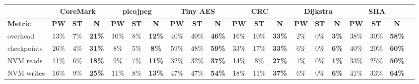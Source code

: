 \begin{tabular}{@{}l|ccccccccccccccccccc@{}}
\toprule
 & \multicolumn{3}{c}{\textbf{\textsf{CoreMark}}} & \multicolumn{3}{c}{\textbf{\textsf{picojpeg}}} & \multicolumn{3}{c}{\textbf{\textsf{Tiny AES}}} & \multicolumn{3}{c}{\textbf{\textsf{CRC}}} & \multicolumn{3}{c}{\textbf{\textsf{Dijkstra}}} & \multicolumn{3}{c}{\textbf{\textsf{SHA}}} \\ \midrule
\textbf{Metric} & \textbf{\textsf{PW}} & \textbf{\textsf{ST}} & \textbf{\textsf{N}} & \textbf{\textsf{PW}} & \textbf{\textsf{ST}} & \textbf{\textsf{N}} & \textbf{\textsf{PW}} & \textbf{\textsf{ST}} & \textbf{\textsf{N}} & \textbf{\textsf{PW}} & \textbf{\textsf{ST}} & \textbf{\textsf{N}} & \textbf{\textsf{PW}} & \textbf{\textsf{ST}} & \textbf{\textsf{N}} & \textbf{\textsf{PW}} & \textbf{\textsf{ST}} & \textbf{\textsf{N}} \\
overhead & 13\% & \hphantom{0}7\% & \textbf{\colorbox{hightlight!51!white}{21\%}} & 10\% & \hphantom{0}8\% & \textbf{\colorbox{hightlight!42!white}{12\%}} & 40\% & 40\% & \textbf{\colorbox{hightlight!76!white}{46\%}} & 16\% & \hphantom{0}10\% & \textbf{\colorbox{hightlight!63!white}{33\%}} & \hphantom{0}2\% & \hphantom{0}0\% & \textbf{\colorbox{hightlight!32!white}{\hphantom{0}3\%}} & 38\% & 30\% & \textbf{\colorbox{hightlight!87!white}{58\%}} \\
checkpoints & 26\% & \hphantom{0}4\% & \textbf{\colorbox{hightlight!60!white}{31\%}} & \hphantom{0}8\% & \hphantom{0}5\% & \textbf{\colorbox{hightlight!38!white}{\hphantom{0}8\%}} & 59\% & 48\% & \textbf{\colorbox{hightlight!88!white}{59\%}} & 33\% & 17\% & \textbf{\colorbox{hightlight!63!white}{33\%}} & \hphantom{0}6\% & \hphantom{0}0\% & \textbf{\colorbox{hightlight!36!white}{\hphantom{0}6\%}} & 40\% & 20\% & \textbf{\colorbox{hightlight!89!white}{60\%}} \\
NVM reads & 11\% & \hphantom{0}6\% & \textbf{\colorbox{hightlight!47!white}{18\%}} & \hphantom{0}9\% & \hphantom{0}7\% & \textbf{\colorbox{hightlight!40!white}{11\%}} & 32\% & 32\% & \textbf{\colorbox{hightlight!67!white}{37\%}} & 14\% & \hphantom{0}8\% & \textbf{\colorbox{hightlight!57!white}{27\%}} & \hphantom{0}1\% & \hphantom{0}0\% & \textbf{\colorbox{hightlight!31!white}{\hphantom{0}1\%}} & 33\% & 25\% & \textbf{\colorbox{hightlight!80!white}{50\%}} \\
NVM writes & 16\% & \hphantom{0}9\% & \textbf{\colorbox{hightlight!55!white}{25\%}} & 11\% & \hphantom{0}8\% & \textbf{\colorbox{hightlight!42!white}{13\%}} & 47\% & 47\% & \textbf{\colorbox{hightlight!84!white}{54\%}} & 18\% & 11\% & \textbf{\colorbox{hightlight!66!white}{37\%}} & \hphantom{0}6\% & \hphantom{0}0\% & \textbf{\colorbox{hightlight!36!white}{\hphantom{0}6\%}} & 41\% & 33\% & \textbf{\colorbox{hightlight!93!white}{64\%}} \\
 \bottomrule
\end{tabular}
